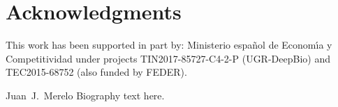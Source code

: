 \documentclass[10pt,journal,compsoc]{IEEEtran}
\begin{document}


\section*{Acknowledgments}

This work has been supported in part by: Ministerio espa\~{n}ol de
Econom\'{\i}a y Competitividad under projects  TIN2017-85727-C4-2-P (UGR-DeepBio) and TEC2015-68752 (also funded by FEDER).






\begin{IEEEbiographynophoto}{Juan~J.~Merelo}
Biography text here.
\end{IEEEbiographynophoto}






\end{document}
